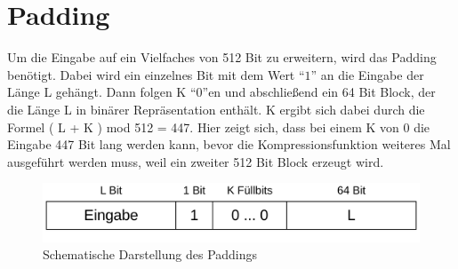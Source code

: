\section{Padding}
\label{sec:sha256:padding}

Um die Eingabe auf ein Vielfaches von 512 Bit zu erweitern, wird das Padding benötigt. Dabei wird ein einzelnes Bit mit dem Wert "`$1$"' an die Eingabe der Länge L gehängt.
Dann folgen K "`$0$"'en und abschließend ein 64 Bit Block, der die Länge L in binärer Repräsentation enthält. K ergibt sich dabei durch die Formel ( L + K ) mod 512 = 447.
Hier zeigt sich, dass bei einem K von 0 die Eingabe 447 Bit lang werden kann, bevor die Kompressionsfunktion weiteres Mal ausgeführt werden muss, weil ein zweiter 512 Bit Block
erzeugt wird.

\begin{figure}[!h]
  \centering
  \includegraphics[scale=0.4]{images/sha256padding}
  \caption{Schematische Darstellung des Paddings}
  \label{fig:sha256padding}
\end{figure}